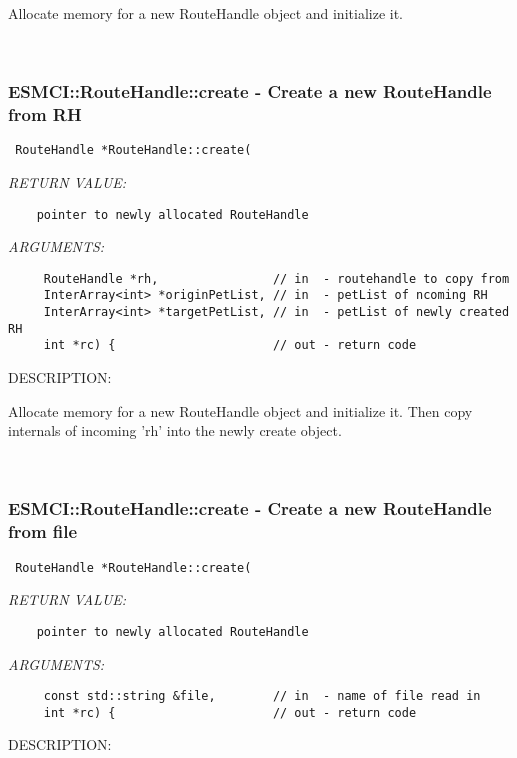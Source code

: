     Allocate memory for a new RouteHandle object and initialize it. 
   
 
\mbox{}\hrulefill\ 
 
\subsubsection [ESMCI::RouteHandle::create] {ESMCI::RouteHandle::create - Create a new RouteHandle from RH}


  
\begin{verbatim} RouteHandle *RouteHandle::create(\end{verbatim}{\em RETURN VALUE:}
\begin{verbatim}    pointer to newly allocated RouteHandle\end{verbatim}{\em ARGUMENTS:}
\begin{verbatim}     RouteHandle *rh,                // in  - routehandle to copy from
     InterArray<int> *originPetList, // in  - petList of ncoming RH
     InterArray<int> *targetPetList, // in  - petList of newly created RH
     int *rc) {                      // out - return code\end{verbatim}
{\sf DESCRIPTION:\\ }


    Allocate memory for a new RouteHandle object and initialize it.
    Then copy internals of incoming 'rh' into the newly create object.
   
 
\mbox{}\hrulefill\ 
 
\subsubsection [ESMCI::RouteHandle::create] {ESMCI::RouteHandle::create - Create a new RouteHandle from file}


  
\begin{verbatim} RouteHandle *RouteHandle::create(\end{verbatim}{\em RETURN VALUE:}
\begin{verbatim}    pointer to newly allocated RouteHandle\end{verbatim}{\em ARGUMENTS:}
\begin{verbatim}     const std::string &file,        // in  - name of file read in
     int *rc) {                      // out - return code\end{verbatim}
{\sf DESCRIPTION:\\ }


